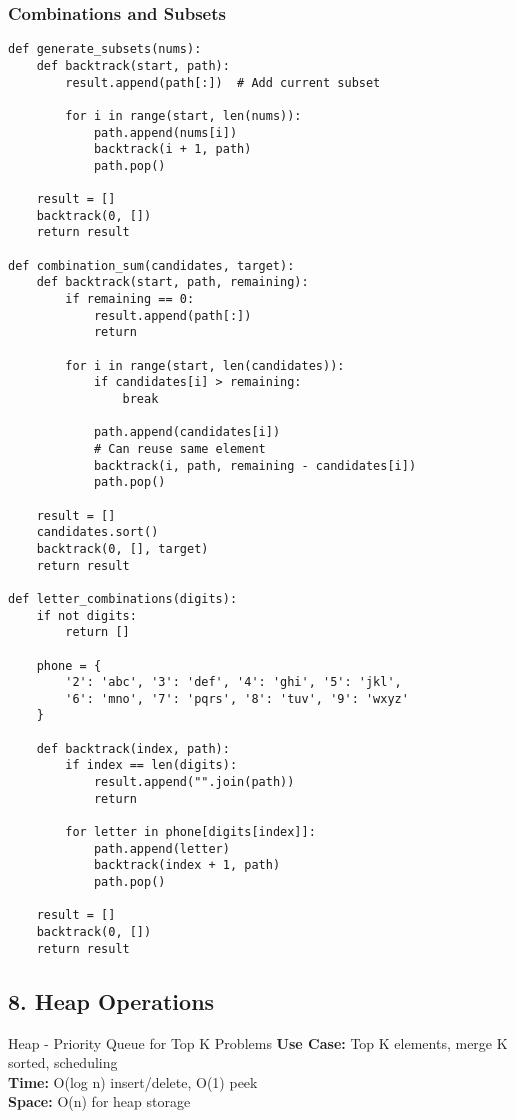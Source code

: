 \documentclass[10pt,a4paper]{article}
\begin{document}
\subsubsection{Combinations and Subsets}
\begin{lstlisting}
def generate_subsets(nums):
    def backtrack(start, path):
        result.append(path[:])  # Add current subset

        for i in range(start, len(nums)):
            path.append(nums[i])
            backtrack(i + 1, path)
            path.pop()

    result = []
    backtrack(0, [])
    return result

def combination_sum(candidates, target):
    def backtrack(start, path, remaining):
        if remaining == 0:
            result.append(path[:])
            return

        for i in range(start, len(candidates)):
            if candidates[i] > remaining:
                break

            path.append(candidates[i])
            # Can reuse same element
            backtrack(i, path, remaining - candidates[i])
            path.pop()

    result = []
    candidates.sort()
    backtrack(0, [], target)
    return result

def letter_combinations(digits):
    if not digits:
        return []

    phone = {
        '2': 'abc', '3': 'def', '4': 'ghi', '5': 'jkl',
        '6': 'mno', '7': 'pqrs', '8': 'tuv', '9': 'wxyz'
    }

    def backtrack(index, path):
        if index == len(digits):
            result.append("".join(path))
            return

        for letter in phone[digits[index]]:
            path.append(letter)
            backtrack(index + 1, path)
            path.pop()

    result = []
    backtrack(0, [])
    return result
\end{lstlisting}

\subsection{8. Heap Operations}

\begin{patternbox}{Heap - Priority Queue for Top K Problems}
\textbf{Use Case:} Top K elements, merge K sorted, scheduling\\
\textbf{Time:} O(log n) insert/delete, O(1) peek\\
\textbf{Space:} O(n) for heap storage
\end{patternbox}
\end{document}
